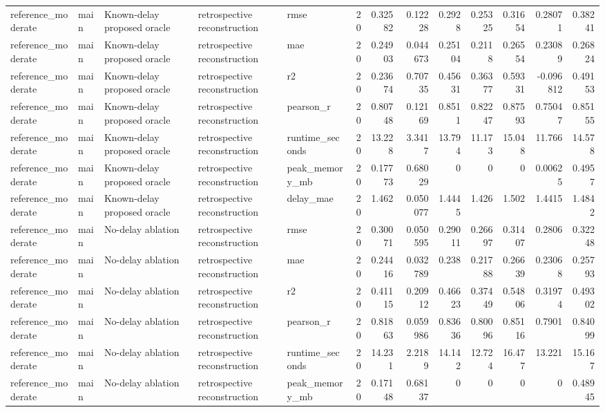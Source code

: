\begin{table}[!htbp]
{{\begin{tabular}{lllllrrrrrrrr}
reference_moderate & main & Known-delay proposed oracle & retrospective reconstruction & rmse & 20 & 0.32582 & 0.12228 & 0.2928 & 0.25325 & 0.31654 & 0.28071 & 0.38241 \\
reference_moderate & main & Known-delay proposed oracle & retrospective reconstruction & mae & 20 & 0.24903 & 0.044673 & 0.25104 & 0.2118 & 0.26554 & 0.23089 & 0.26824 \\
reference_moderate & main & Known-delay proposed oracle & retrospective reconstruction & r2 & 20 & 0.23674 & 0.70735 & 0.45631 & 0.36377 & 0.59331 & -0.096812 & 0.49153 \\
reference_moderate & main & Known-delay proposed oracle & retrospective reconstruction & pearson_r & 20 & 0.80748 & 0.12169 & 0.8511 & 0.82247 & 0.87593 & 0.75047 & 0.85155 \\
reference_moderate & main & Known-delay proposed oracle & retrospective reconstruction & runtime_seconds & 20 & 13.228 & 3.3417 & 13.794 & 11.173 & 15.048 & 11.766 & 14.578 \\
reference_moderate & main & Known-delay proposed oracle & retrospective reconstruction & peak_memory_mb & 20 & 0.17773 & 0.68029 & 0 & 0 & 0 & 0.00625 & 0.4957 \\
reference_moderate & main & Known-delay proposed oracle & retrospective reconstruction & delay_mae & 20 & 1.462 & 0.050077 & 1.4445 & 1.426 & 1.502 & 1.4415 & 1.4842 \\
reference_moderate & main & No-delay ablation & retrospective reconstruction & rmse & 20 & 0.30071 & 0.050595 & 0.29011 & 0.26697 & 0.31407 & 0.2806 & 0.32248 \\
reference_moderate & main & No-delay ablation & retrospective reconstruction & mae & 20 & 0.24416 & 0.032789 & 0.238 & 0.21788 & 0.26639 & 0.23068 & 0.25793 \\
reference_moderate & main & No-delay ablation & retrospective reconstruction & r2 & 20 & 0.41115 & 0.20912 & 0.46623 & 0.37449 & 0.54806 & 0.31974 & 0.49302 \\
reference_moderate & main & No-delay ablation & retrospective reconstruction & pearson_r & 20 & 0.81863 & 0.059986 & 0.83636 & 0.80096 & 0.85116 & 0.7901 & 0.84099 \\
reference_moderate & main & No-delay ablation & retrospective reconstruction & runtime_seconds & 20 & 14.231 & 2.2189 & 14.142 & 12.724 & 16.477 & 13.221 & 15.167 \\
reference_moderate & main & No-delay ablation & retrospective reconstruction & peak_memory_mb & 20 & 0.17148 & 0.68137 & 0 & 0 & 0 & 0 & 0.48945 \\

\end{tabular}}}
\end{table}
